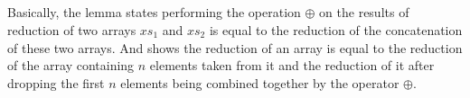 \documentclass{l4proj}
\begin{document}
\begin{code}%
\>[0]\AgdaSpace{}%
\AgdaSymbol{:}%
\>[1692I]\AgdaSymbol{(}\AgdaSpace{}%
\AgdaSymbol{:}\AgdaSpace{}%
\AgdaSymbol{)}\AgdaSpace{}%
\AgdaSpace{}%
\AgdaSymbol{\{}\AgdaSpace{}%
\AgdaSymbol{:}\AgdaSpace{}%
\AgdaSymbol{\}}\AgdaSpace{}%
\AgdaSpace{}%
\AgdaSymbol{\{}\AgdaSpace{}%
\AgdaSymbol{:}\AgdaSpace{}%
\AgdaSymbol{\}}\AgdaSpace{}%
\<%
\\
\>[.][@{}l@{}]\<[1692I]%
\>[19]\AgdaSymbol{(}\AgdaSpace{}%
\AgdaSymbol{:}\AgdaSpace{}%
\AgdaSpace{}%
\AgdaSymbol{)}\AgdaSpace{}%
\AgdaSpace{}%
\AgdaSymbol{(}\AgdaSpace{}%
\AgdaSymbol{:}\AgdaSpace{}%
\AgdaSpace{}%
\AgdaSpace{}%
\AgdaSymbol{(}\AgdaSpace{}%
\AgdaOperator{\AgdaPrimitive{+}}\AgdaSpace{}%
\AgdaSymbol{))}\AgdaSpace{}%
\<%
\\
%
\>[19]\AgdaSpace{}%
\AgdaSpace{}%
\AgdaSymbol{=}\AgdaSpace{}%
\AgdaSpace{}%
\AgdaSpace{}%
\<%
\\
%
\>[19]\AgdaSpace{}%
\AgdaSpace{}%
\AgdaSpace{}%
\<%
\\
%
\>[19]\AgdaSpace{}%
\AgdaSpace{}%
\AgdaSymbol{(}\AgdaSpace{}%
\AgdaSpace{}%
\AgdaSymbol{\{}\AgdaSymbol{\}}\AgdaSpace{}%
\AgdaSymbol{)}\AgdaSpace{}%
\AgdaSpace{}%
\AgdaSpace{}%
\AgdaSpace{}%
\AgdaSymbol{(}\AgdaSpace{}%
\AgdaSpace{}%
\AgdaSymbol{\{}\AgdaSymbol{\}}\AgdaSpace{}%
\AgdaSymbol{)}\<%
\end{code}
Basically, the lemma  states performing the operation $\oplus$ on the results of reduction of two arrays $xs_1$ and $xs_2$ is equal to the reduction of the concatenation of these two arrays. And  shows the reduction of an array is equal to the reduction of the array containing $n$ elements taken from it and the reduction 
of it after dropping the first $n$ elements being combined together by the operator $\oplus$.
\end{document}
